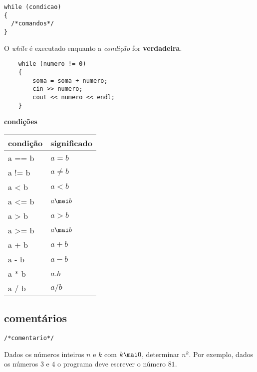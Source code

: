 \documentclass[a4paper]{memoir}
\begin{document}
\begin{lstlisting}
while (condicao)
{
  /*comandos*/
}
\end{lstlisting}

O \emph{while} é executado enquanto a \emph{condição} for \textbf{verdadeira}.

\begin{lstlisting}
    while (numero != 0)
    {
        soma = soma + numero;
        cin >> numero;
        cout << numero << endl;
    }
\end{lstlisting}

\textbf{condições}

\begin{center}
\begin{tabular}{l|l}
  condição & significado\\
  \hline
  a == b & $a = b$\\
  a != b & $a \ne b$\\
  a < b  & $a < b$\\
  a <= b & $a \mei b$\\
  a > b  & $a > b$\\
  a >= b & $a \mai b$\\
  a + b  & $a + b$\\
  a - b  & $a - b$\\
  a * b  & $a . b$\\
  a / b  & $a / b$\\
\end{tabular}
\end{center}

\subsection*{comentários}

\verb|/*comentario*/|

\begin{prob}\label{prob102.cpp}
Dados os números inteiros $n$ e $k$ com $k \mai 0$, determinar $n^k$. Por exemplo, dados os números $3$ e $4$ o programa deve escrever o número $81$.
\end{prob}
\end{document}
